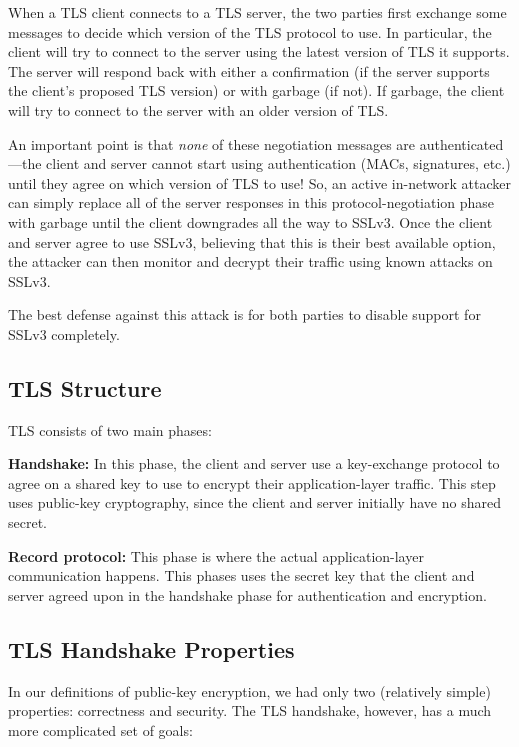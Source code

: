 When a TLS client connects to a TLS server, the two parties
first exchange some messages to decide which version of the TLS
protocol to use.
In particular, the client will try to connect to the server using
the latest version of TLS it supports.
The server will respond back with either a confirmation 
(if the server supports the client's proposed TLS version) or with garbage
(if not).
If garbage, the client will try to connect to the server
with an older version of TLS.

An important point is that \emph{none} of these negotiation messages
are authenticated---the client and server cannot start
using authentication (MACs, signatures, etc.) until they agree on 
which version of TLS to use!
So, an active in-network attacker
can simply replace all of the server responses in
this protocol-negotiation phase
with garbage until the client downgrades all the way to SSLv3.
Once the client and server agree to use SSLv3,
believing that this is their best available option,
the attacker can then monitor and decrypt their
traffic using known attacks on SSLv3.

The best defense against this attack is for both parties to
disable support for SSLv3 completely.

\subsection{TLS Structure}
TLS consists of two main phases:
\begin{compactenum}
\item \textbf{Handshake:}
  In this phase, the client and server use a key-exchange protocol to agree on a shared key to use to encrypt their application-layer traffic. This step uses public-key cryptography, since the client and server initially have no shared secret.
\item \textbf{Record protocol:} This phase is where the actual application-layer communication happens. This phases uses the secret key that the client and server agreed  upon in the handshake phase for authentication and encryption. 
\end{compactenum}

\subsection{TLS Handshake Properties}
In our definitions of public-key encryption, we
had only two (relatively simple) properties: 
correctness and security. 
The TLS handshake, however, has a much more complicated
set of goals:

